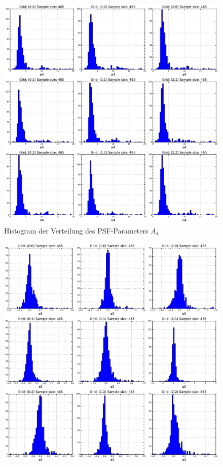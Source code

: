\begin{appendix}
\begin{figure}[H]
	\centering
	\includegraphics[scale=.42]{psf_dist/a4.pdf}
	\caption[Histogram der Verteilung des PSF-Parameters $A_4$]{Histogram der Verteilung des PSF-Parameters $A_4$}
    \label{psf_dist_a4}
\end{figure}
\begin{figure}[H]
	\centering
	\includegraphics[scale=.42]{psf_dist/a5.pdf}

\end{figure}
\end{appendix}
